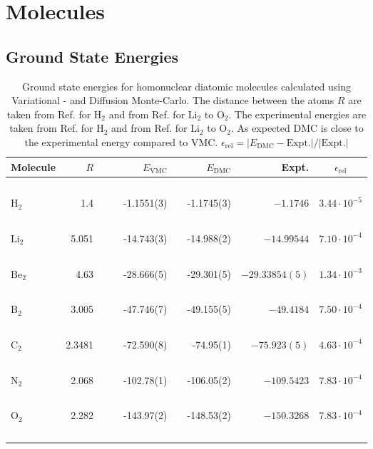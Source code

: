 \section{Molecules}

\subsection{Ground State Energies}
 
\begin{table}
\begin{center}
\begin{tabular}{lrccrlrrc}
Molecule & $R$ & & \qquad & $E_\mathrm{VMC}$ & & \qquad $E_\mathrm{DMC}$ & \qquad\,\, Expt. & \qquad $\epsilon_\mathrm{rel}$\\
\hline\hline
\ \\
$\mathrm{H_2}$ & 1.4   & &\qquad & -1.1551(3)    & \qquad   & -1.1745(3)   & \qquad $-1.1746$      & \qquad $3.44\cdot 10^{-5}$ \\
\ \\
$\mathrm{Li_2}$& 5.051 & &\qquad & -14.743(3)    & \qquad   & -14.988(2)   & \qquad $-14.99544$    & \qquad $7.10\cdot 10^{-4}$ \\
\ \\
$\mathrm{Be_2}$& 4.63  & &\qquad & -28.666(5)    & \qquad   & -29.301(5)   & \qquad $-29.33854(5)$ & \qquad $1.34\cdot 10^{-3}$  \\
\ \\
$\mathrm{B_2}$ & 3.005 & &\qquad & -47.746(7)    & \qquad   & -49.155(5)   & \qquad $-49.4184$     & \qquad $7.50\cdot 10^{-4}$  \\
\ \\
$\mathrm{C_2}$ & 2.3481& &\qquad & -72.590(8)    & \qquad   & -74.95(1)    & \qquad $-75.923(5)$   & \qquad $4.63\cdot 10^{-4}$  \\
\ \\
$\mathrm{N_2}$ & 2.068 & &\qquad & -102.78(1)    & \qquad   & -106.05(2)   & \qquad $-109.5423$    & \qquad $7.83\cdot 10^{-4}$  \\
\ \\
$\mathrm{O_2}$ & 2.282 & &\qquad & -143.97(2)    & \qquad   & -148.53(2)   & \qquad $-150.3268$    & \qquad $7.83\cdot 10^{-4}$  \\
\ \\
\end{tabular}
\caption{Ground state energies for homonuclear diatomic molecules calculated using Variational - and Diffusion Monte-Carlo. The distance between the atoms $R$ are taken from Ref. \cite{H_He_exact} for $\mathrm{H_2}$ and from Ref. \cite{UmrigarMolecules} for $\mathrm{Li_2}$ to $\mathrm{O_2}$. The experimental energies are taken from Ref. \cite{H_He_exact} for $\mathrm{H_2}$ and from Ref. \cite{ExactMolecules} for $\mathrm{Li_2}$ to $\mathrm{O_2}$. As expected DMC is close to the experimental energy compared to VMC. $\epsilon_\mathrm{rel} = |E_\mathrm{DMC} - \mathrm{Expt.}|/|\mathrm{Expt.}|$}
\label{tab:MoleculesRes}
\end{center}
\end{table}


